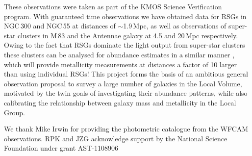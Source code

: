 \documentclass[iop]{emulateapj}
\begin{document}
These observations were taken as part of the KMOS Science Verification program.
With guaranteed time observations we have obtained data for RSGs in NGC\,300 and NGC\,55 at distances of $\sim$1.9\,Mpc,
as well as observations of super-star clusters in M\,83 and the Antennae galaxy at 4.5 and 20\,Mpc respectively.
Owing to the fact that RSGs dominate the light output from super-star clusters
\citep{2013MNRAS.430L..35G} these clusters can be analysed for abundance estimates in a similar manner
\citep{2014ApJ...787..142G},
which will provide metallicity measurements at distances a factor of 10 larger than using individual RSGs!
This project forms the basis of an ambitious general observation proposal to survey a large number of galaxies in the Local Volume,
motivated by the twin goals of investigating their abundance patterns,
while also calibrating the relationship between galaxy mass and metallicity in the Local Group.





\acknowledgments

We thank Mike Irwin for providing the photometric catalogue from the WFCAM observations.
RPK and JZG acknowledge support by the National Science Foundation under grant AST-1108906

\end{document}
